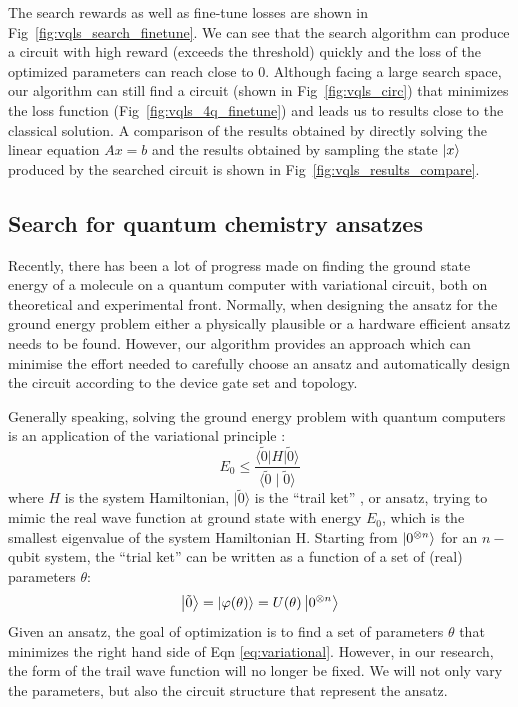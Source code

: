 \documentclass[a4paper,onecolumn,11pt]{quantumarticle}
\begin{document}
The search rewards as well as fine-tune losses are shown in Fig~\ref{fig:vqls_search_finetune}. We can see that the search algorithm can produce a circuit with high reward (exceeds the threshold) quickly and the loss of the optimized parameters can reach close to 0. Although facing a large search space, our algorithm can still find a circuit (shown in Fig~\ref{fig:vqls_circ}) that minimizes the loss function (Fig~\ref{fig:vqls_4q_finetune}) and leads us to results close to the classical solution. A comparison of the results obtained by directly solving the linear equation $Ax=b$ and the results obtained by sampling the state $\ket{x}$ produced by the searched circuit is shown in Fig~\ref{fig:vqls_results_compare}. 


\subsection{Search for quantum chemistry ansatzes}\label{h2}


Recently, there has been a lot of progress made on finding the ground state energy of a molecule on a quantum computer with variational circuit, both on theoretical \cite{li2017efficient,mcclean2016theory,wecker2015progress} and experimental \cite{peruzzo2014variational,o2016scalable, colless2017implementing, kandala2017hardware, colless2018computation, dumitrescu2018cloud} front. 
Normally, when designing the ansatz for the ground energy problem either a physically plausible or a hardware efficient ansatz needs to be found. However, our algorithm provides an approach which can minimise the effort needed to carefully choose an ansatz and automatically design the circuit according to the device gate set and topology.

Generally speaking, solving the ground energy problem with quantum computers is an application of the variational principle \cite{sakurai_napolitano_2017}:
\begin{equation}
E_0 \leq \frac{\langle\tilde{0}|H| \tilde{0}\rangle}{\langle\tilde{0} \mid \tilde{0}\rangle} \label{eq:variational}
\end{equation}
where $H$ is the system Hamiltonian, $| \tilde{0}\rangle$ is the ``trail ket'' \cite{sakurai_napolitano_2017}, or ansatz, trying to mimic the real wave function at ground state with energy $E_0$, which is the smallest eigenvalue of the system Hamiltonian H. Starting from $\ket{0^{\otimes n}}$ for an $n-$qubit system, the ``trial ket'' can be written as a function of a set of (real) parameters $\theta$:
\begin{equation}
    \ket{\tilde{0}} = \ket{\varphi (\theta)} = U(\theta)\ket{0^{\otimes n}}
\end{equation}
Given an ansatz, the goal of optimization is to find a set of parameters $\theta$ that minimizes the right hand side of Eqn \ref{eq:variational}. However, in our research, the form of the trail wave function will no longer be fixed. We will not only vary the parameters, but also the circuit structure that represent the ansatz.
\end{document}
